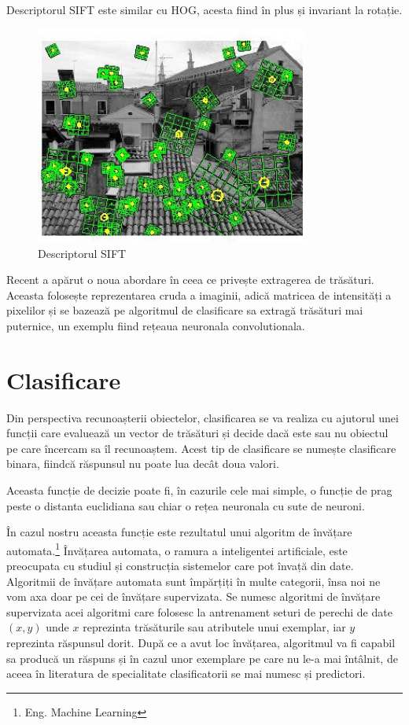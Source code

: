 Descriptorul SIFT este similar cu HOG, acesta fiind în plus și invariant la rotație.
\begin{figure}[H]
	\centering
		\includegraphics[width=0.80\textwidth]{imagini/sift0.jpg}
	\caption{Descriptorul SIFT\protect\footnotemark}
	\label{fig:sift}
\end{figure}

Recent a apărut o noua abordare în ceea ce privește extragerea de trăsături.
Aceasta folosește reprezentarea cruda a imaginii, adică matricea de intensități a pixelilor și se bazează pe algoritmul de clasificare sa extragă trăsături mai puternice, un exemplu fiind rețeaua neuronala convolutionala.\cite{lecun-98}

\pagebreak
\section{Clasificare}

Din perspectiva recunoașterii obiectelor, clasificarea se va realiza cu ajutorul unei funcții care evaluează un vector de trăsături și decide dacă este sau nu obiectul pe care încercam sa îl recunoaștem. 
Acest tip de clasificare se numește clasificare binara, fiindcă răspunsul nu poate lua decât doua valori.

Aceasta funcție de decizie poate fi, în cazurile cele mai simple, o funcție de prag peste o distanta euclidiana sau chiar o rețea neuronala cu sute de neuroni.

În cazul nostru aceasta funcție este rezultatul unui algoritm de învățare automata.\footnote{Eng. Machine Learning}
Învățarea automata, o ramura a inteligentei artificiale, este preocupata cu studiul și construcția sistemelor care pot învață din date.
Algoritmii de învățare automata sunt împărțiți în multe categorii, însa noi ne vom axa doar pe cei de învățare supervizata.
Se numesc algoritmi de învățare supervizata acei algoritmi care folosesc la antrenament seturi de perechi de date ${(x,y)}$ unde ${x}$ reprezinta trăsăturile sau atributele unui exemplar, iar ${y}$ reprezinta răspunsul dorit. 
După ce a avut loc învățarea, algoritmul va fi capabil sa producă un răspuns și în cazul unor exemplare pe care nu le-a mai întâlnit, de aceea în literatura de specialitate clasificatorii se mai numesc și predictori.

